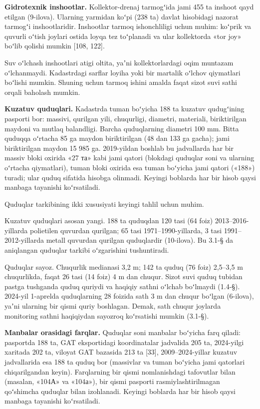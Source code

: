 \textbf{Gidrotexnik inshootlar.} Kollektor-drenaj tarmogʻida jami 455 ta
inshoot qayd etilgan (9-ilova). Ularning yarmidan koʻpi (238 ta) davlat
hisobidagi nazorat tarmogʻi inshootlaridir. Inshootlar tarmoq
ishonchliligi uchun muhim: koʻprik va quvurli oʻtish joylari ostida
loyqa tez toʻplanadi va ular kollektorda «tor joy» boʻlib qolishi mumkin
{[}108, 122{]}.

Suv oʻlchash inshootlari atigi oltita, yaʼni kollektorlardagi oqim
muntazam oʻlchanmaydi. Kadastrdagi sarflar loyiha yoki bir martalik
oʻlchov qiymatlari boʻlishi mumkin. Shuning uchun tarmoq ishini amalda
faqat sizot suvi sathi orqali baholash mumkin.

\textbf{Kuzatuv quduqlari.} Kadastrda tuman boʻyicha 188 ta kuzatuv
qudugʻining pasporti bor: massivi, qurilgan yili, chuqurligi, diametri,
materiali, biriktirilgan maydoni va mutlaq balandligi. Barcha
quduqlarning diametri 100 mm. Bitta quduqqa oʻrtacha 85 ga maydon
biriktirilgan (48 dan 133 ga gacha); jami biriktirilgan maydon 15 985
ga. 2019-yildan boshlab bu jadvallarda har bir massiv bloki oxirida «27
та» kabi jami qatori (blokdagi quduqlar soni va ularning oʻrtacha
qiymatlari), tuman bloki oxirida esa tuman boʻyicha jami qatori («188»)
turadi; ular quduq sifatida hisobga olinmadi. Keyingi boblarda har bir
hisob qaysi manbaga tayanishi koʻrsatiladi.

Quduqlar tarkibining ikki xususiyati keyingi tahlil uchun muhim.

Kuzatuv quduqlari asosan yangi. 188 ta quduqdan 120 tasi (64 foiz)
2013--2016-yillarda polietilen quvurdan qurilgan; 65 tasi
1971--1990-yillarda, 3 tasi 1991--2012-yillarda metall quvurdan qurilgan
quduqlardir (10-ilova). Bu 3.1-§ da aniqlangan quduqlar tarkibi
oʻzgarishini tushuntiradi.

Quduqlar sayoz. Chuqurlik medianasi 3,2 m; 142 ta quduq (76 foiz)
2,5--3,5 m chuqurlikda, faqat 26 tasi (14 foiz) 4 m dan chuqur. Sizot
suvi quduq tubidan pastga tushganda quduq quriydi va haqiqiy sathni
oʻlchab boʻlmaydi (1.4-§). 2024-yil 1-aprelda quduqlarning 28 foizida
sath 3 m dan chuqur boʻlgan (6-ilova), yaʼni ularning bir qismi quriy
boshlagan. Demak, sath chuqur joylarda monitoring sathni haqiqiydan
sayozroq koʻrsatishi mumkin (3.1-§).

\textbf{Manbalar orasidagi farqlar.} Quduqlar soni manbalar boʻyicha
farq qiladi: pasportda 188 ta, GAT eksportidagi koordinatalar jadvalida
205 ta, 2024-yilgi xaritada 202 ta, viloyat GAT bazasida 213 ta
{[}33{]}, 2009--2024-yillar kuzatuv jadvallarida esa 188 ta quduq bor
(massivlar va tuman boʻyicha jami qatorlari chiqarilgandan keyin).
Farqlarning bir qismi nomlanishdagi tafovutlar bilan (masalan, «104А» va
«104а»), bir qismi pasporti rasmiylashtirilmagan qoʻshimcha quduqlar
bilan izohlanadi. Keyingi boblarda har bir hisob qaysi manbaga tayanishi
koʻrsatiladi.

